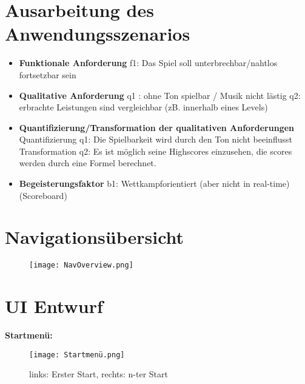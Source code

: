 \documentclass[12pt, a4paper]{article}
\begin{document}
\section{Ausarbeitung des Anwendungsszenarios}
\begin{flushleft}
\begin{itemize}
\item\textbf{Funktionale Anforderung}
\newline
f1: Das Spiel soll unterbrechbar/nahtlos fortsetzbar sein
\newline\newline
\item\textbf{Qualitative Anforderung}
\newline
q1 : ohne Ton spielbar / Musik nicht lästig
\newline
q2: erbrachte Leistungen sind vergleichbar (zB. innerhalb eines Levels)
\newline\newline
\item\textbf{Quantifizierung/Transformation der qualitativen Anforderungen}
\newline
Quantifizierung q1:  Die Spielbarkeit wird durch den Ton nicht beeinflusst
\newline
Transformation q2: Es ist möglich seine Highscores einzusehen, die scores werden durch eine Formel berechnet.
\newline\newline
\item\textbf{Begeisterungsfaktor}
\newline
b1: Wettkampforientiert (aber nicht in real-time)(Scoreboard)
\newline\newline
\end{itemize}
\end{flushleft}

\newpage
\section{Navigationsübersicht}
\begin{figure}[H]
\centering
\texttt{[image: NavOverview.png]}
\end{figure}

\newpage
\section{UI Entwurf}
\textbf{Startmenü:}
\begin{figure}[H]
\centering
\texttt{[image: Startmenü.png]}
\caption{links: Erster Start, rechts: n-ter Start}
\end{figure}
\end{document}
